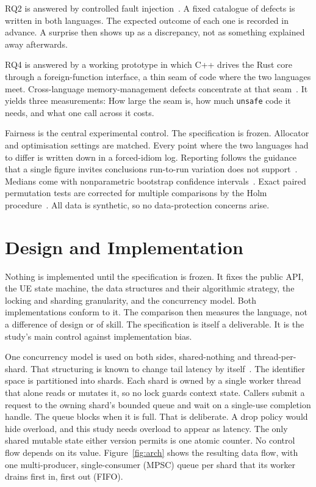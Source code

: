 \documentclass[english,twoside,openright,a4paper,censored,csm,software-track-2020]{HYthesisML}
\begin{document}
RQ2 is answered by controlled fault injection~\cite{natella2016fault}. A fixed catalogue
of defects is written in both languages. The expected outcome of each one is recorded in
advance. A surprise then shows up as a discrepancy, not as something explained away
afterwards.

RQ4 is answered by a working prototype in which C++ drives the Rust core through a
foreign-function interface, a thin seam of code where the two languages meet.
Cross-language memory-management defects concentrate at that seam~\cite{li2022crosslang}.
It yields three measurements: How large the seam is, how
much \texttt{unsafe} code it needs, and what one call across it costs.

Fairness is the central experimental control. The specification is frozen. Allocator and
optimisation settings are matched. Every point where the two languages had to differ is
written down in a forced-idiom log. Reporting follows the guidance that a single figure
invites conclusions run-to-run variation does not
support~\cite{georges2007rigorous}. Medians come with nonparametric bootstrap confidence
intervals~\cite{efron1993bootstrap}. Exact paired permutation tests are corrected for
multiple comparisons by the Holm procedure~\cite{holm1979simple}. All data is synthetic,
so no data-protection concerns arise.

\chapter{Design and Implementation\label{chapter:design}}

Nothing is implemented until the specification is frozen. It fixes the public API, the
UE state machine, the data structures and their algorithmic strategy, the locking and
sharding granularity, and the concurrency model. Both implementations conform to it.
The comparison then measures the language, not a difference of design or of skill. The
specification is itself a deliverable. It is the study's main control against
implementation bias.

One concurrency model is used on both sides, shared-nothing and thread-per-shard.
That structuring is known to change tail latency by
itself~\cite{enberg2019threadpercore}. The identifier space is partitioned into shards.
Each shard is owned by a single worker thread that alone reads or mutates it, so no lock
guards context state. Callers submit a request to the owning shard's bounded queue and
wait on a single-use completion handle. The queue blocks when it is full. That is
deliberate. A drop policy would hide overload, and this study needs overload to appear as
latency. The only shared mutable state either version permits is one atomic counter. No
control flow depends on its value. Figure~\ref{fig:arch} shows the resulting data flow,
with one multi-producer, single-consumer (MPSC) queue per shard that its worker drains
first in, first out (FIFO).
\end{document}
